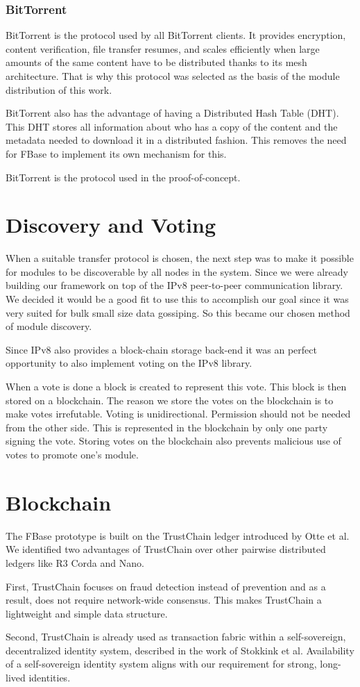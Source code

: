 \subsubsection{\textbf{BitTorrent}}

BitTorrent is the protocol used by all BitTorrent clients. It provides encryption, content verification, file transfer resumes, and scales efficiently when large amounts of the same content have to be distributed thanks to its mesh architecture. That is why this protocol was selected as the basis of the module distribution of this work.

BitTorrent also has the advantage of having a Distributed Hash Table (DHT). This DHT stores all information about who has a copy of the content and the metadata needed to download it in a distributed fashion. This removes the need for FBase to implement its own mechanism for this.

BitTorrent is the protocol used in the proof-of-concept.

\section{Discovery and Voting}

When a suitable transfer protocol is chosen, the next step was to make it possible for modules to be discoverable by all nodes in the system. Since we were already building our framework on top of the IPv8 peer-to-peer communication library. We decided it would be a good fit to use this to accomplish our goal since it was very suited for bulk small size data gossiping. So this became our chosen method of module discovery.

Since IPv8 also provides a block-chain storage back-end it was an perfect opportunity to also implement voting on the IPv8 library.

When a vote is done a block is created to represent this vote. This block is then stored on a blockchain. The reason we store the votes on the blockchain is to make votes irrefutable. Voting is unidirectional. Permission should not be needed from the other side. This is represented in the blockchain by only one party signing the vote. Storing votes on the blockchain also prevents malicious use of votes to promote one's module.

\section{Blockchain}

The FBase prototype is built on the TrustChain ledger introduced by Otte et al. We identified two advantages of TrustChain over other pairwise distributed ledgers like R3 Corda and Nano. 

First, TrustChain focuses on fraud detection instead of prevention and as a result, does not require network-wide consensus. This makes TrustChain a lightweight and simple data structure.

Second, TrustChain is already used as transaction fabric within a self-sovereign, decentralized identity system, described in the work of Stokkink et al. Availability of a self-sovereign identity system aligns with our requirement for strong, long-lived identities.